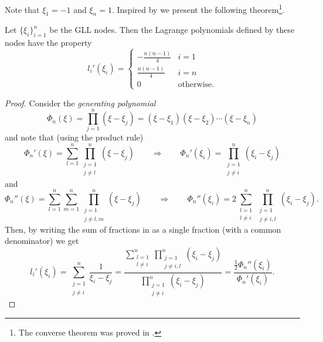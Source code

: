 Note that $\xi_1= -1$ and $\xi_n=1$. Inspired by \cite[p. 305-306]{Fichtner2010fsw} we present the following theorem\footnote{The converse theorem was proved in \cite[p. 305-306]{Fichtner2010fsw}.}.
\begin{theorem}
	Let $\{\xi_i\}_{i=1}^n$ be the GLL nodes. Then the Lagrange polynomials defined by these nodes have the property
	\begin{equation*}
		l_i'(\xi_i) = \begin{cases}
			-\frac{n(n-1)}{4} & i=1\\
			\frac{n(n-1)}{4} & i=n\\
			0 & \text{otherwise.}
		\end{cases}
	\end{equation*}
\end{theorem}
\begin{proof}
	Consider the \textit{generating polynomial}
	\begin{equation*}
		\Phi_n(\xi) = \prod_{j=1}^n (\xi-\xi_j) = (\xi-\xi_1)(\xi-\xi_2)\cdots(\xi-\xi_n)
	\end{equation*}
	and note that (using the product rule)
	\begin{equation}\label{Eq5:dPhi}
		\Phi_n'(\xi) = \sum_{l=1}^n \prod_{\substack{j=1\\j\neq l}}^n (\xi-\xi_j)\qquad\Rightarrow\qquad  \Phi_n'(\xi_i) = \prod_{\substack{j=1\\j\neq i}}^n (\xi_i-\xi_j)
	\end{equation}
	and
	\begin{equation*}
		\Phi_n''(\xi) = \sum_{l=1}^n \sum_{m=1}^n \prod_{\substack{j=1\\j\neq l,m}}^n (\xi-\xi_j)\qquad\Rightarrow\qquad  \Phi_n''(\xi_i) = 2\sum_{\substack{l=1\\l\neq i}}^n \prod_{\substack{j=1\\j\neq i,l}}^n (\xi_i-\xi_j).
	\end{equation*}
	Then, by writing the sum of fractions in  as a single fraction (with a common denominator) we get
	\begin{equation}\label{Eq5:BderivPhi}
		l_i'(\xi_i) = \sum_{\substack{j=1\\j\neq i}}^n \frac{1}{\xi_i-\xi_j} = \frac{\displaystyle\sum_{\substack{l=1\\l\neq i}}^n\prod_{\substack{j=1\\j\neq i,l}}^n (\xi_i-\xi_j)}{\displaystyle\prod_{\substack{j=1\\j\neq i}}^n (\xi_i-\xi_j)} =\frac{\frac12\Phi_n''(\xi_i)}{\Phi_n'(\xi_i)}.

\end{equation}
\end{proof}
